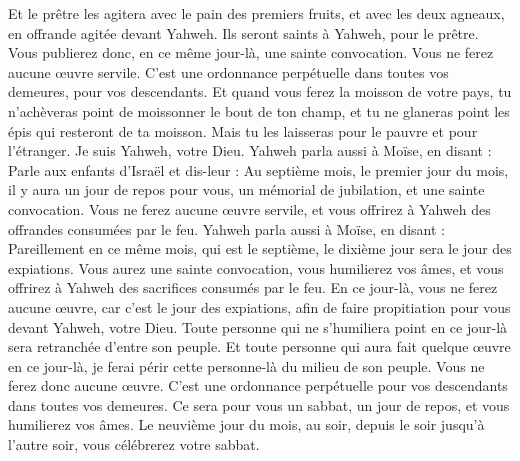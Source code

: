 \begin{multicols}{2}
Et le prêtre les agitera avec le pain des premiers fruits, et avec les deux agneaux, en offrande agitée devant Yahweh. Ils seront saints à Yahweh, pour le prêtre.
Vous publierez donc, en ce même jour-là, une sainte convocation. Vous ne ferez aucune œuvre servile. C'est une ordonnance perpétuelle dans toutes vos demeures, pour vos descendants.
Et quand vous ferez la moisson de votre pays, tu n'achèveras point de moissonner le bout de ton champ, et tu ne glaneras point les épis qui resteront de ta moisson. Mais tu les laisseras pour le pauvre et pour l'étranger. Je suis Yahweh, votre Dieu.
Yahweh parla aussi à Moïse, en disant :
Parle aux enfants d'Israël et dis-leur : Au septième mois, le premier jour du mois, il y aura un jour de repos pour vous, un mémorial de jubilation, et une sainte convocation.
Vous ne ferez aucune œuvre servile, et vous offrirez à Yahweh des offrandes consumées par le feu.
Yahweh parla aussi à Moïse, en disant :
Pareillement en ce même mois, qui est le septième, le dixième jour sera le jour des expiations. Vous aurez une sainte convocation, vous humilierez vos âmes, et vous offrirez à Yahweh des sacrifices consumés par le feu.
En ce jour-là, vous ne ferez aucune œuvre, car c'est le jour des expiations, afin de faire propitiation pour vous devant Yahweh, votre Dieu.
Toute personne qui ne s'humiliera point en ce jour-là sera retranchée d'entre son peuple.
Et toute personne qui aura fait quelque œuvre en ce jour-là, je ferai périr cette personne-là du milieu de son peuple.
Vous ne ferez donc aucune œuvre. C'est une ordonnance perpétuelle pour vos descendants dans toutes vos demeures.
Ce sera pour vous un sabbat, un jour de repos, et vous humilierez vos âmes. Le neuvième jour du mois, au soir, depuis le soir jusqu'à l'autre soir, vous célébrerez votre sabbat.

\end{multicols}
